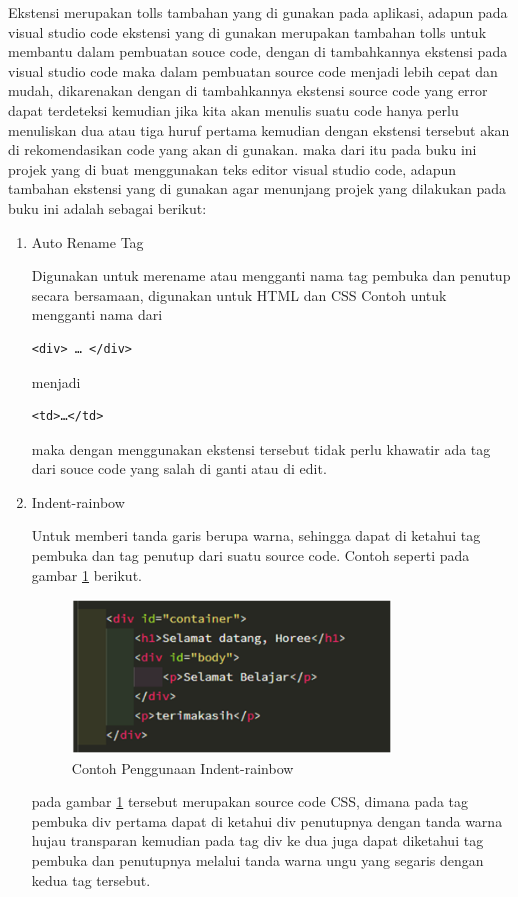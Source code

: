 Ekstensi merupakan tolls tambahan yang di gunakan pada aplikasi, adapun pada visual studio code ekstensi yang di gunakan merupakan tambahan tolls untuk membantu dalam pembuatan souce code, dengan di tambahkannya ekstensi pada visual studio code maka dalam pembuatan source code menjadi lebih cepat dan mudah, dikarenakan dengan di tambahkannya ekstensi source code yang error dapat terdeteksi kemudian jika kita akan menulis suatu code hanya perlu menuliskan dua atau tiga huruf pertama kemudian dengan ekstensi tersebut akan di rekomendasikan code yang akan di gunakan. maka dari itu pada buku ini projek yang di buat menggunakan teks editor visual studio code, adapun tambahan ekstensi yang di gunakan agar menunjang projek yang dilakukan pada buku ini adalah sebagai berikut:
\begin{enumerate}
\item Auto Rename Tag\par
Digunakan untuk merename atau mengganti nama tag pembuka dan penutup secara bersamaan, digunakan untuk HTML dan CSS 
Contoh untuk mengganti nama dari 
\begin{verbatim}
<div> … </div>
\end{verbatim}
 menjadi 
\begin{verbatim}
<td>…</td>
\end{verbatim}
maka dengan menggunakan ekstensi tersebut tidak perlu khawatir ada tag dari souce code yang salah di ganti atau di edit.
\pagebreak
\item Indent-rainbow\par
Untuk memberi tanda garis berupa warna, sehingga dapat di ketahui tag pembuka dan tag penutup dari suatu source code. Contoh seperti pada gambar \ref{V15} berikut.

\begin{figure}[!htbp]
	\centerline{\includegraphics[width=0.80\textwidth]{figures/vs/15.png}}
	\caption{Contoh Penggunaan Indent-rainbow}
	\label{V15}
\end{figure}

pada gambar \ref{V15} tersebut merupakan source code CSS, dimana pada tag pembuka div pertama dapat di ketahui div penutupnya dengan tanda warna hujau transparan kemudian pada tag div ke dua juga dapat diketahui tag pembuka dan penutupnya melalui tanda warna ungu yang segaris dengan kedua tag tersebut.


\end{enumerate}

